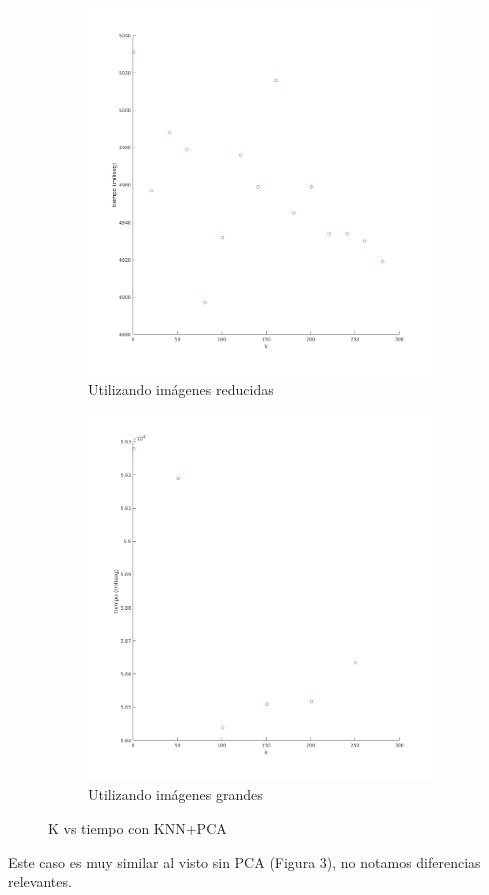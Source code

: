\begin{figure}[H]
\begin{subfigure}[h]{0.62\linewidth}
\includegraphics[width=\linewidth]{img/k_pca_tiempo.png}
\caption{Utilizando imágenes reducidas}
\end{subfigure}
\hfill
\begin{subfigure}[h]{0.62\linewidth}
\includegraphics[width=\linewidth]{img/big_k_pca_tiempo.png}
\caption{Utilizando imágenes grandes}
\end{subfigure}%
\caption{K vs tiempo con KNN+PCA}
\end{figure}
Este caso es muy similar al visto sin PCA (Figura 3), no notamos diferencias relevantes.

